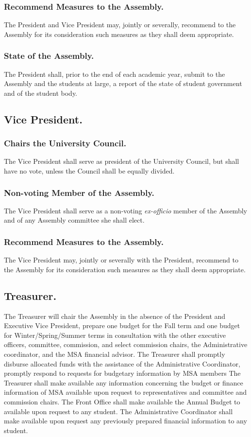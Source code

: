 \subsubsection{Recommend Measures to the Assembly.}
The President and Vice President may, jointly or severally, recommend to the Assembly for its consideration such measures as they shall deem appropriate.

\subsubsection{State of the Assembly.}
The President shall, prior to the end of each academic year, submit to the Assembly and the students at large, a report of the state of student government and of the student body.


\subsection{Vice President.}
\subsubsection{Chairs the University Council.}
The Vice President shall serve as president of the University Council, but shall have no vote, unless the Council shall be equally divided.

\subsubsection{Non-voting Member of the Assembly.}
The Vice President shall serve as a non-voting \textit{ex-officio} member of the Assembly and of any Assembly committee she shall elect.

\subsubsection{Recommend Measures to the Assembly.}
The Vice President may, jointly or severally with the President, recommend to the Assembly for its consideration such measures as they shall deem appropriate.


\subsection{Treasurer.}
The Treasurer will chair the Assembly in the absence of the President and Executive Vice President, prepare one budget for the Fall term and one budget for Winter/Spring/Summer terms in consultation with the other executive officers, committee, commission, and select commission chairs, the Administrative coordinator, and the MSA financial advisor. The Treasurer shall promptly disburse allocated funds with the assistance of the Administrative Coordinator, promptly respond to requests for budgetary information by MSA members The Treasurer shall make available any information concerning the budget or finance information of MSA available upon request to representatives and committee and commission chairs. The Front Office shall make available the Annual Budget to available upon request to any student. The Administrative Coordinator shall make available upon request any previously prepared financial information to any student. 

